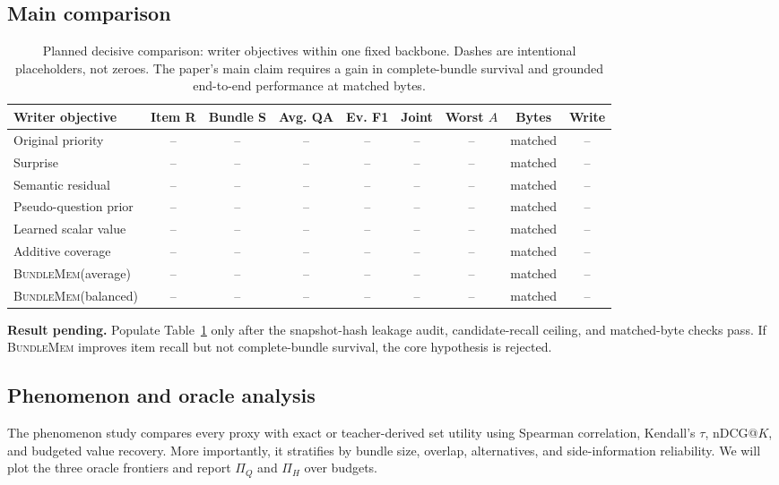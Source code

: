 \documentclass[10pt,twocolumn,letterpaper]{article}
\newcommand{\method}{\textnormal{\textsc{BundleMem}}\xspace}
\newcommand{\resultpending}[1]{%
  \begingroup\setlength{\fboxsep}{3pt}%
  \colorbox{placeholdergray}{\parbox{0.94\linewidth}{\textcolor{draftorange}{\textbf{Result pending.} #1}}}%
  \endgroup}
\begin{document}
\subsection{Main comparison}

\begin{table}[t]
\centering
\caption{Planned decisive comparison: writer objectives within one fixed backbone. Dashes are intentional placeholders, not zeroes. The paper's main claim requires a gain in complete-bundle survival and grounded end-to-end performance at matched bytes.}
\label{tab:main}
\scriptsize
\setlength{\tabcolsep}{3.8pt}
\begin{tabularx}{\textwidth}{>{\raggedright\arraybackslash}Xcccccccc}
\toprule
Writer objective & Item R & Bundle S & Avg. QA & Ev. F1 & Joint & Worst $A$ & Bytes & Write \\
\midrule
Original priority & -- & -- & -- & -- & -- & -- & matched & -- \\
Surprise & -- & -- & -- & -- & -- & -- & matched & -- \\
Semantic residual & -- & -- & -- & -- & -- & -- & matched & -- \\
Pseudo-question prior & -- & -- & -- & -- & -- & -- & matched & -- \\
Learned scalar value & -- & -- & -- & -- & -- & -- & matched & -- \\
Additive coverage & -- & -- & -- & -- & -- & -- & matched & -- \\
\method (average) & -- & -- & -- & -- & -- & -- & matched & -- \\
\method (balanced) & -- & -- & -- & -- & -- & -- & matched & -- \\
\bottomrule
\end{tabularx}
\end{table}

\resultpending{Populate Table~\ref{tab:main} only after the snapshot-hash leakage audit, candidate-recall ceiling, and matched-byte checks pass. If \method improves item recall but not complete-bundle survival, the core hypothesis is rejected.}

\subsection{Phenomenon and oracle analysis}

The phenomenon study compares every proxy with exact or teacher-derived set utility using Spearman correlation, Kendall's $\tau$, nDCG@$K$, and budgeted value recovery.
More importantly, it stratifies by bundle size, overlap, alternatives, and side-information reliability.
We will plot the three oracle frontiers and report $\Pi_Q$ and $\Pi_H$ over budgets.
\end{document}
